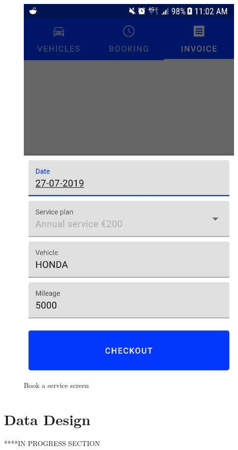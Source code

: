 \begin{figure}[h!]
\begin{minipage}[b]{0.4\textwidth}
    \includegraphics[width=\textwidth]{book_service_screen.jpg}
    \caption{Book a service screen}
  \end{minipage}
\end{figure}

\section{Data Design}

****IN PROGRESS SECTION